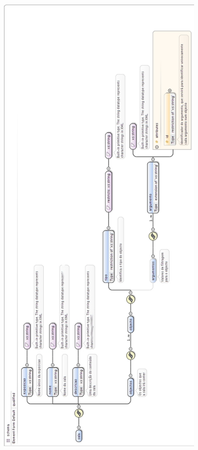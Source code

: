 \documentclass[letterpaper]{article}
\begin{document}
\bigskip


\bigskip


\bigskip


\bigskip


\bigskip


\begin{center}
\includegraphics[width=4.0299in,height=9.4in]{relatoriopartebruno-img1.jpg}
\end{center}
\end{document}
